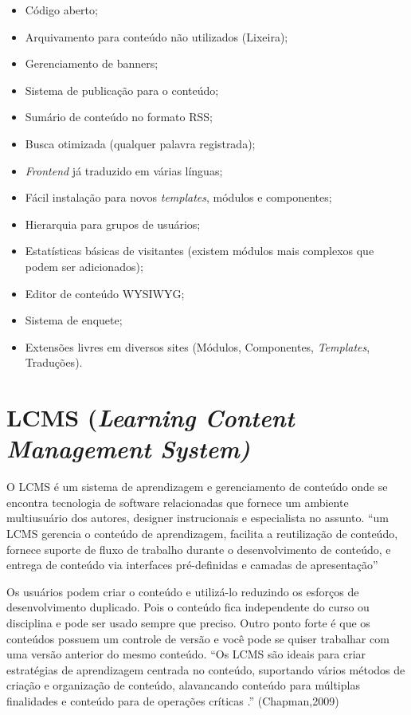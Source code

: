 \documentclass[12pt]{article}
\begin{document}
\begin{itemize}
 \setlength\itemsep{0.5em}
 \item Código aberto;
 \item Arquivamento para conteúdo não utilizados (Lixeira);
 \item Gerenciamento de banners;
 \item Sistema de publicação para o conteúdo;
 \item Sumário de conteúdo no formato RSS;
 \item Busca otimizada (qualquer palavra registrada);
 \item \textit{Frontend} já traduzido em várias línguas;
 \item Fácil instalação para novos \textit{templates}, módulos e componentes;
 \item Hierarquia para grupos de usuários;
 \item Estatísticas básicas de visitantes (existem módulos mais complexos que podem ser adicionados);
 \item Editor de conteúdo WYSIWYG;
 \item Sistema de enquete;
 \item Extensões livres em diversos sites (Módulos, Componentes, \textit{Templates}, Traduções).
\end{itemize}

\section{LCMS (\textit{Learning Content Management System)}}

O LCMS é um sistema de aprendizagem e gerenciamento de conteúdo onde se encontra tecnologia de software relacionadas que fornece um ambiente 
multiusuário dos autores, designer instrucionais e especialista no assunto. “um LCMS gerencia o conteúdo de aprendizagem, facilita a reutilização 
de conteúdo, fornece suporte de fluxo de trabalho durante o desenvolvimento de conteúdo, e entrega de conteúdo via interfaces pré-definidas e 
camadas de apresentação” \cite{chapman2001learning}

Os usuários podem criar o conteúdo e utilizá-lo reduzindo os esforços de desenvolvimento duplicado. Pois o conteúdo fica independente do curso 
ou disciplina e pode ser usado sempre que preciso. Outro ponto forte é que os conteúdos possuem um controle de versão e você pode se quiser 
trabalhar com uma versão anterior do mesmo conteúdo. “Os LCMS são ideais para criar estratégias de aprendizagem centrada no conteúdo, suportando 
vários métodos de criação e organização de conteúdo, alavancando conteúdo para múltiplas finalidades e conteúdo para de operações críticas .” 
(Chapman,2009)
\end{document}

